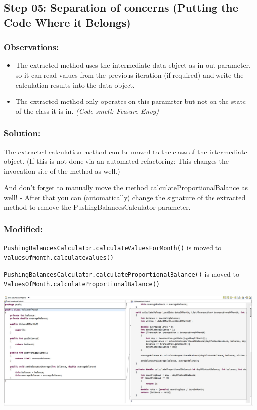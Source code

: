 \documentclass[a4paper,fleqn,titlepage,11pt]{article}
\begin{document}
\subsection*{Step 05: Separation of concerns (Putting the Code Where it Belongs)}

\subsubsection*{Observations:}
\begin{itemize}
\item The extracted method uses the intermediate data object as in-out-parameter, so it can read values from the previous iteration (if required) and write the calculation results into the data object.
\item The extracted method only operates on this parameter but not on the state of the class it is in. {\em (Code smell: Feature Envy)}
\end{itemize}

\subsubsection*{Solution:}

The extracted calculation method can be moved to the class of the intermediate object. (If this is not done via an automated refactoring: This changes the invocation site of the method as well.)

And don't forget to manually move the method calculateProportionalBalance as well! - After that you can (automatically) change the signature of the extracted method to remove the PushingBalancesCalculator parameter.

\subsubsection*{Modified:}

\texttt{PushingBalancesCalculator.calculateValuesForMonth()} is moved to\\ \texttt{ValuesOfMonth.calculateValues()}

\texttt{PushingBalancesCalculator.calculateProportionalBalance()} is moved to\\ \texttt{ValuesOfMonth.calculateProportionalBalance()}

\includegraphics[width=1\textwidth]{CompareViews/04-05-1.jpg}
\end{document}
